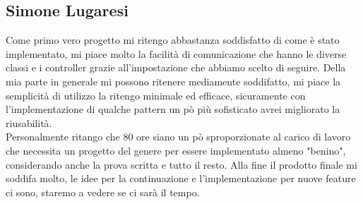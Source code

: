 \documentclass[a4paper,12pt]{report}
\begin{document}
\subsection*{Simone Lugaresi}
Come primo vero progetto mi ritengo abbastanza soddisfatto di come è stato implementato, mi piace molto la facilità di comunicazione che hanno le diverse classi e i controller grazie all'impostazione che abbiamo scelto di seguire. Della mia parte in generale mi possono ritenere mediamente soddifatto, mi piace la semplicità di utilizzo la ritengo minimale ed efficace, sicuramente con l'implementazione di qualche pattern un pò più sofisticato avrei migliorato la riusabilità.\\ Personalmente ritango che 80 ore siano un pò sproporzionate al carico di lavoro che necessita un progetto del genere per essere implementato almeno "benino", considerando anche la prova scritta e tutto il resto. Alla fine il prodotto finale mi soddifa molto, le idee per la continuazione e l'implementazione per nuove feature ci sono, staremo a vedere se ci sarà il tempo.

\appendix
\end{document}
